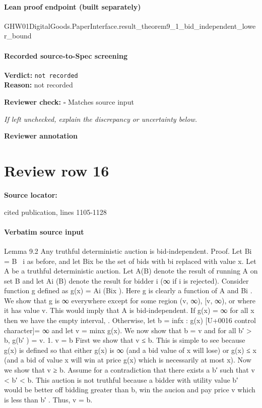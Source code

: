 \documentclass[10pt]{article}
\newcommand{\reviewerbox}{%
  \par\noindent\fbox{\parbox{0.96\linewidth}{\rule{0pt}{0.38in}}}\par
}
\newcommand{\reviewmatch}[1]{%
  \par\noindent\textbf{Reviewer check:} $\square$\; #1\par
  \noindent\emph{If left unchecked, explain the discrepancy or uncertainty below.}\par
}
\begin{document}
\paragraph{Lean proof endpoint (built separately)}\begin{ReviewVerbatim}
GHW01DigitalGoods.PaperInterface.result_theorem9_1_bid_independent_lower_bound
\end{ReviewVerbatim}

\paragraph{Recorded source-to-Spec screening}
\textbf{Verdict:} \texttt{not recorded}
\\
\textbf{Reason:} not recorded
\reviewmatch{Matches source input}
\noindent\textbf{Reviewer annotation}\par
\reviewerbox
\clearpage
\hypertarget{source-claim-60df12d3b02570ba}{}
\section*{Review row 16}
\textbf{Source locator:} {\footnotesize\raggedright cited publication, lines 1105-\allowbreak{}1128\par}
\paragraph{Verbatim source input}
\begin{ReviewVerbatim}
Lemma 9.2 Any truthful deterministic auction is
bid-independent.
Proof. Let Bi = B \ {i} as before, and let Bix be
the set of bids with bi replaced with value x. Let
A be a truthful deterministic auction. Let A(B) denote the result of running A on set B and let Ai (B)
denote the result for bidder i (∞ if i is rejected).
Consider function g defined as g(x) = Ai (Bix ). Here
g is clearly a function of A and Bi . We show that
g is ∞ everywhere except for some region (v, ∞),
[v, ∞), or {} where it has value v. This would imply that A is bid-independent. If g(x) = ∞ for all x
then we have the empty interval, {}. Otherwise, let
b = inf{x : g(x) [U+0016 control character]= ∞} and let v = minx g(x). We
now show that b = v and for all b′ > b, g(b′ ) = v.
1. v = b
First we show that v ≤ b. This is simple to see
because g(x) is defined so that either g(x) is ∞
(and a bid value of x will lose) or g(x) ≤ x (and
a bid of value x will win at price g(x) which is
necessarily at most x).
Now we show that v ≥ b. Assume for a contradiction that there exists a b′ such that v < b′ < b.
This auction is not truthful because a bidder
with utility value b′ would be better off bidding
greater than b, win the aucion and pay price v
which is less than b′ . Thus, v = b.
\end{ReviewVerbatim}
\end{document}
